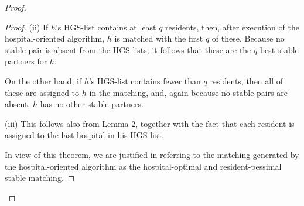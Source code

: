 \documentclass[14pt]{extarticle}
\begin{document}
\begin{proof}
\begin{proof}
(ii) If $h$’s HGS-list contains at least $q$ residents, then, after execution of the hospital-oriented algorithm, $h$ is matched with the first $q$ of these. Because no stable pair is absent from the HGS-lists, it follows that these are the $q$ best stable partners for $h$.

On the other hand, if $h$’s HGS-list contains fewer than $q$ residents, then all of these are assigned to $h$ in the matching, and, again because no stable pairs are absent, $h$ has no other stable partners.

(iii) This follows also from Lemma 2, together with the fact that each resident is assigned to the last hospital in his HGS-list.

In view of this theorem, we are justified in referring to the matching generated by the hospital-oriented algorithm as the hospital-optimal and resident-pessimal stable matching.
\end{proof}
\end{proof}
\end{document}
